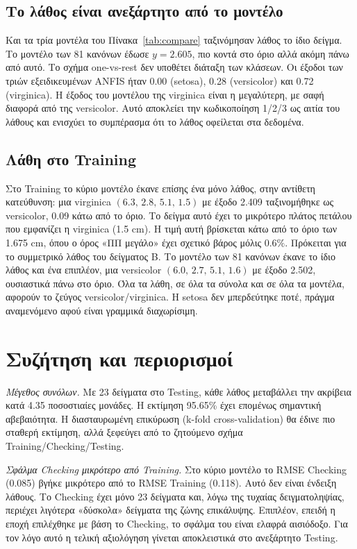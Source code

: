 \documentclass[conference]{IEEEtran}
\begin{document}
\subsection{Το λάθος είναι ανεξάρτητο από το μοντέλο}
Και τα τρία μοντέλα του Πίνακα~\ref{tab:compare} ταξινόμησαν λάθος το ίδιο δείγμα.
Το μοντέλο των 81 κανόνων έδωσε $y=2.605$, πιο κοντά στο όριο αλλά ακόμη πάνω από αυτό.
Το σχήμα one-vs-rest δεν υποθέτει διάταξη των κλάσεων. Οι έξοδοι των τριών εξειδικευμένων ANFIS ήταν
0.00 (setosa), 0.28 (versicolor) και 0.72 (virginica). Η έξοδος του μοντέλου
της virginica είναι η μεγαλύτερη, με σαφή διαφορά από της versicolor. Αυτό αποκλείει την
κωδικοποίηση 1/2/3 ως αιτία του λάθους και ενισχύει το συμπέρασμα ότι το λάθος οφείλεται
στα δεδομένα.

\subsection{Λάθη στο Training}
Στο Training το κύριο μοντέλο έκανε επίσης ένα μόνο λάθος, στην αντίθετη
κατεύθυνση: μια virginica $(6.3,\,2.8,\,5.1,\,1.5)$ με έξοδο 2.409 ταξινομήθηκε ως
versicolor, 0.09 κάτω από το όριο. Το δείγμα αυτό έχει το μικρότερο πλάτος
πετάλου που εμφανίζει η virginica (1.5 cm). Η τιμή αυτή βρίσκεται κάτω από το
όριο των 1.675 cm, όπου ο όρος «ΠΠ μεγάλο» έχει σχετικό βάρος μόλις $0.6\%$.
Πρόκειται για το συμμετρικό λάθος του δείγματος Β. Το μοντέλο των 81 κανόνων έκανε το ίδιο λάθος
και ένα επιπλέον, μια versicolor $(6.0,\,2.7,\,5.1,\,1.6)$ με έξοδο 2.502, ουσιαστικά
πάνω στο όριο. Όλα τα λάθη, σε όλα τα σύνολα και σε όλα τα μοντέλα, αφορούν
το ζεύγος versicolor/virginica. Η setosa δεν μπερδεύτηκε ποτέ, πράγμα αναμενόμενο
αφού είναι γραμμικά διαχωρίσιμη.

\section{Συζήτηση και περιορισμοί}

\textit{Μέγεθος συνόλων.} Με 23 δείγματα στο Testing, κάθε λάθος μεταβάλλει την
ακρίβεια κατά 4.35 ποσοστιαίες μονάδες. Η εκτίμηση 95.65\% έχει επομένως
σημαντική αβεβαιότητα. Η διασταυρωμένη επικύρωση (k-fold cross-validation) θα
έδινε πιο σταθερή εκτίμηση, αλλά ξεφεύγει από το ζητούμενο σχήμα
Training/Checking/Testing.

\textit{Σφάλμα Checking μικρότερο από Training.} Στο κύριο μοντέλο το RMSE
Checking (0.085) βγήκε μικρότερο από το RMSE Training (0.118). Αυτό δεν
είναι ένδειξη λάθους. Το Checking έχει μόνο 23 δείγματα και, λόγω της τυχαίας
δειγματοληψίας, περιέχει λιγότερα «δύσκολα» δείγματα της ζώνης επικάλυψης.
Επιπλέον, επειδή η εποχή επιλέχθηκε με βάση το Checking, το σφάλμα του είναι
ελαφρά αισιόδοξο. Για τον λόγο αυτό η τελική αξιολόγηση γίνεται αποκλειστικά στο
ανεξάρτητο Testing.
\end{document}
